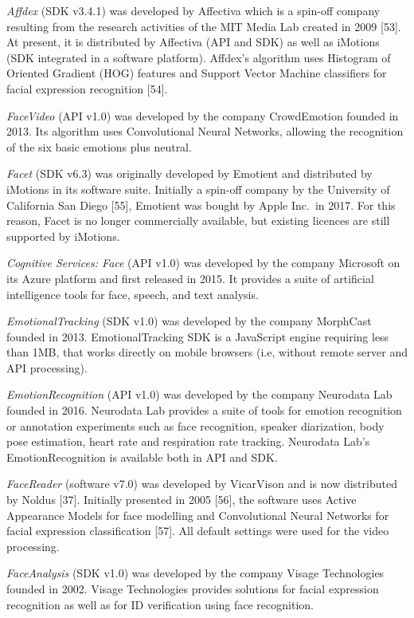 \documentclass[10pt,letterpaper]{article}
\begin{document}
\emph{Affdex} (SDK v3.4.1) was developed by Affectiva which is a spin-off company resulting from the research activities of the MIT Media Lab created in 2009 {[}53{]}. At present, it is distributed by Affectiva (API and SDK) as well as iMotions (SDK integrated in a software platform). Affdex's algorithm uses Histogram of Oriented Gradient (HOG) features and Support Vector Machine classifiers for facial expression recognition {[}54{]}.

\emph{FaceVideo} (API v1.0) was developed by the company CrowdEmotion founded in 2013. Its algorithm uses Convolutional Neural Networks, allowing the recognition of the six basic emotions plus neutral.

\emph{Facet} (SDK v6.3) was originally developed by Emotient and distributed by iMotions in its software suite. Initially a spin-off company by the University of California San Diego {[}55{]}, Emotient was bought by Apple Inc.~in 2017. For this reason, Facet is no longer commercially available, but existing licences are still supported by iMotions.

\emph{Cognitive Services: Face} (API v1.0) was developed by the company Microsoft on its Azure platform and first released in 2015. It provides a suite of artificial intelligence tools for face, speech, and text analysis.

\emph{EmotionalTracking} (SDK v1.0) was developed by the company MorphCast founded in 2013. EmotionalTracking SDK is a JavaScript engine requiring less than 1MB, that works directly on mobile browsers (i.e, without remote server and API processing).

\emph{EmotionRecognition} (API v1.0) was developed by the company Neurodata Lab founded in 2016. Neurodata Lab provides a suite of tools for emotion recognition or annotation experiments such as face recognition, speaker diarization, body pose estimation, heart rate and respiration rate tracking. Neurodata Lab's EmotionRecognition is available both in API and SDK.

\emph{FaceReader} (software v7.0) was developed by VicarVison and is now distributed by Noldus {[}37{]}. Initially presented in 2005 {[}56{]}, the software uses Active Appearance Models for face modelling and Convolutional Neural Networks for facial expression classification {[}57{]}. All default settings were used for the video processing.

\emph{FaceAnalysis} (SDK v1.0) was developed by the company Visage Technologies founded in 2002. Visage Technologies provides solutions for facial expression recognition as well as for ID verification using face recognition.
\end{document}

